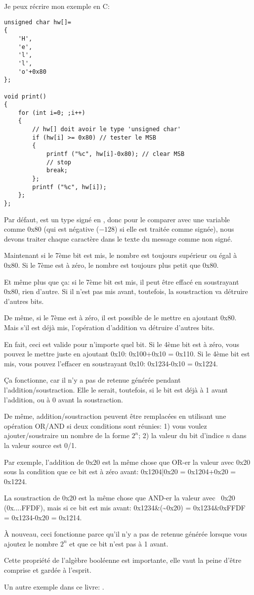 Je peux récrire mon exemple en C:

\begin{lstlisting}[style=customc]
unsigned char hw[]=
{
	'H',
	'e',
	'l',
	'l',
	'o'+0x80
};

void print()
{
	for (int i=0; ;i++)
	{
		// hw[] doit avoir le type 'unsigned char'
		if (hw[i] >= 0x80) // tester le MSB
		{
			printf ("%c", hw[i]-0x80); // clear MSB
			// stop
			break;
		};
		printf ("%c", hw[i]);
	};
};
\end{lstlisting}

Par défaut,  est un type signé en \CCpp, donc pour le comparer avec une
variable comme 0x80 (qui est négative ($-128$) si elle est traitée comme signée),
nous devons traiter chaque caractère dans le texte du message comme non signé.

Maintenant si le 7ème bit est mis, le nombre est toujours supérieur ou égal à
0x80.
Si le 7ème est à zéro, le nombre est toujours plus petit que 0x80.

Et même plus que ça: si le 7ème bit est mis, il peut être effacé en soustrayant 0x80,
rien d'autre.
Si il n'est pas mis avant, toutefois, la soustraction va détruire d'autres bits.

De même, si le 7ème est à zéro, il est possible de le mettre en ajoutant 0x80.
Mais s'il est déjà mis, l'opération d'addition va détruire d'autres bits.

En fait, ceci est valide pour n'importe quel bit.
Si le 4ème bit est à zéro, vous pouvez le mettre juste en ajoutant 0x10: 0x100+0x10 = 0x110.
Si le 4ème bit est mis, vous pouvez l'effacer en soustrayant 0x10: 0x1234-0x10 = 0x1224.

Ça fonctionne, car il n'y a pas de retenue générée pendant l'addition/soustraction.
Elle le serait, toutefois, si le bit est déjà à 1 avant l'addition, ou à 0 avant
la soustraction.

De même, addition/soustraction peuvent être remplacées en utilisant une opération
OR/AND si deux conditions sont réunies:
1) vous voulez ajouter/soustraire un nombre de la forme $2^n$;
2) la valeur du bit d'indice $n$ dans la valeur source est 0/1.

Par exemple, l'addition de 0x20 est la même chose que OR-er la valeur avec 0x20 sous
la condition que ce bit est à zéro avant:
0x1204|0x20 = 0x1204+0x20 = 0x1224.

La soustraction de 0x20 est la même chose que AND-er la valeur avec ~0x20 (0x....FFDF),
mais si ce bit est mis avant:
0x1234\&(\~{}0x20) = 0x1234\&0xFFDF = 0x1234-0x20 = 0x1214.

À nouveau, ceci fonctionne parce qu'il n'y a pas de retenue générée lorsque vous ajoutez
le nombre $2^n$ et que ce bit n'est pas à 1 avant.

Cette propriété de l'algèbre booléenne est importante, elle vaut la peine d'être comprise
et gardée à l'esprit.

Un autre exemple dans ce livre: .

